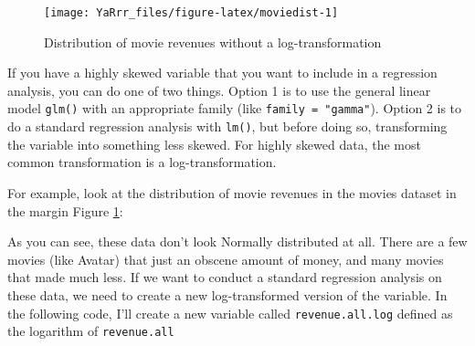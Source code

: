 \documentclass[]{book}
\newenvironment{Shaded}{\begin{snugshade}}{\end{snugshade}}
\newcommand{\KeywordTok}[1]{\textcolor[rgb]{0.13,0.29,0.53}{\textbf{#1}}}
\newcommand{\DataTypeTok}[1]{\textcolor[rgb]{0.13,0.29,0.53}{#1}}
\newcommand{\CharTok}[1]{\textcolor[rgb]{0.31,0.60,0.02}{#1}}
\newcommand{\StringTok}[1]{\textcolor[rgb]{0.31,0.60,0.02}{#1}}
\newcommand{\CommentTok}[1]{\textcolor[rgb]{0.56,0.35,0.01}{\textit{#1}}}
\newcommand{\OperatorTok}[1]{\textcolor[rgb]{0.81,0.36,0.00}{\textbf{#1}}}
\newcommand{\NormalTok}[1]{#1}
\theoremstyle{definition}
\theoremstyle{definition}
\theoremstyle{remark}
\begin{document}
\begin{Shaded}
\end{Shaded}

\begin{figure}

{\centering \texttt{[image: YaRrr\_files/figure-latex/moviedist-1]} 

}

\caption{Distribution of movie revenues without a log-transformation}\label{fig:moviedist}
\end{figure}

If you have a highly skewed variable that you want to include in a
regression analysis, you can do one of two things. Option 1 is to use
the general linear model \texttt{glm()} with an appropriate family (like
\texttt{family\ =\ "gamma"}). Option 2 is to do a standard regression
analysis with \texttt{lm()}, but before doing so, transforming the
variable into something less skewed. For highly skewed data, the most
common transformation is a log-transformation.

For example, look at the distribution of movie revenues in the movies
dataset in the margin Figure \ref{fig:moviedist}:

As you can see, these data don't look Normally distributed at all. There
are a few movies (like Avatar) that just an obscene amount of money, and
many movies that made much less. If we want to conduct a standard
regression analysis on these data, we need to create a new
log-transformed version of the variable. In the following code, I'll
create a new variable called \texttt{revenue.all.log} defined as the
logarithm of \texttt{revenue.all}

\begin{Shaded}
\end{Shaded}
\end{document}
